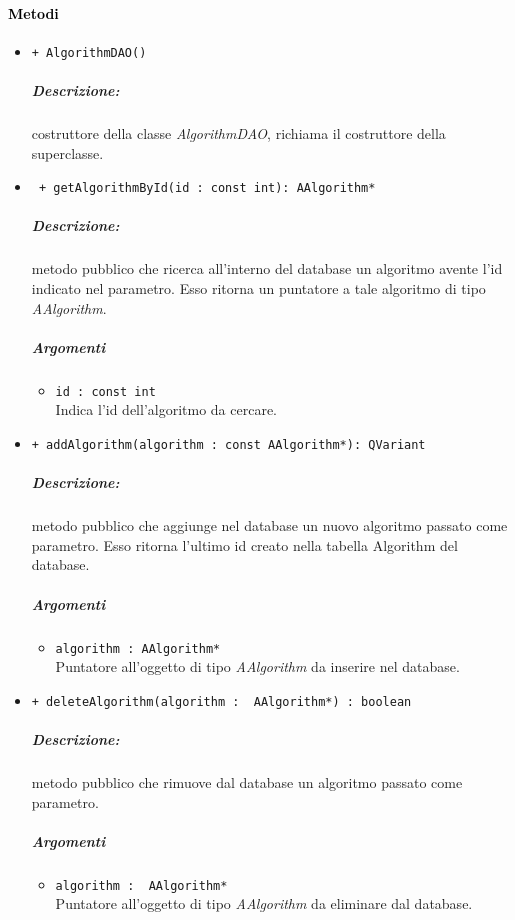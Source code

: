 \paragraph{\textcolor{black}{Metodi\\}}
	\begin{itemize}
		\item \color{blue}\verb!+ AlgorithmDAO()!\\
		\color{black}
		\subparagraph{Descrizione:} costruttore della classe \textsl{AlgorithmDAO}, richiama il costruttore della superclasse.
		
		\item \color{blue}\verb! + getAlgorithmById(id : const int): AAlgorithm*!\\
		\color{black}
		\subparagraph{Descrizione:} metodo pubblico che ricerca all'interno del database un algoritmo avente l'id indicato nel parametro. Esso ritorna un puntatore a tale algoritmo di tipo \textsl{AAlgorithm}.
		\subparagraph{Argomenti}
			\begin{itemize}
				\item \color{RoyalPurple}\verb!id : const int! \\
				\color{black}Indica l'id dell'algoritmo da cercare.
			\end{itemize}
			
		\item \color{blue}\verb!+ addAlgorithm(algorithm : const AAlgorithm*): QVariant!\\
		\color{black}
		\subparagraph{Descrizione:} metodo pubblico che aggiunge nel database un nuovo algoritmo passato come parametro. Esso ritorna l'ultimo id creato nella tabella Algorithm del database.
		\subparagraph{Argomenti}
			\begin{itemize}
				\item \color{RoyalPurple} \verb!algorithm : AAlgorithm*! \\
				\color{black} Puntatore all'oggetto di tipo \textsl{AAlgorithm} da inserire nel database.
			\end{itemize}
			
		\item \color{blue}\verb!+ deleteAlgorithm(algorithm :  AAlgorithm*) : boolean!\\
		\color{black} 
		\subparagraph{Descrizione:} metodo pubblico che rimuove dal database un algoritmo passato come parametro.
		\subparagraph{Argomenti}
			\begin{itemize}
				\item \color{RoyalPurple}\verb!algorithm :  AAlgorithm*! \\ 
				\color{black}Puntatore all'oggetto di tipo \textsl{AAlgorithm} da eliminare dal database.
			\end{itemize}
		

\end{itemize}
